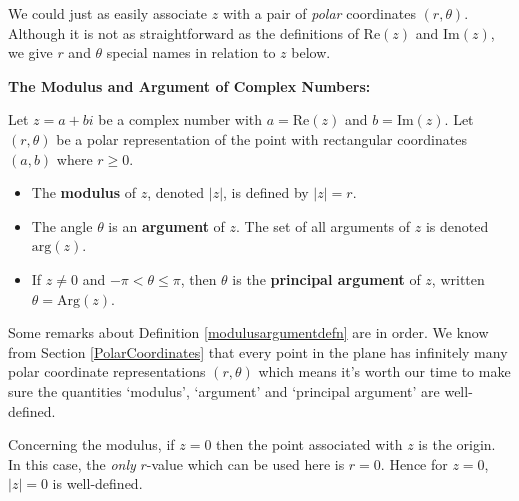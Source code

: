 \documentclass{ximera}
\begin{document}
We could just as easily associate $z$ with a pair of \textit{polar} coordinates $(r,\theta)$.  Although it is not as straightforward as the definitions of $\text{Re}(z)$ and $\text{Im}(z)$, we give $r$ and $\theta$ special names in relation to $z$ below.

 

\begin{definition} \label{modulusargumentdefn} \textbf{The Modulus and Argument of Complex Numbers:} 

 Let $z = a+bi$ be a complex number with $a = \text{Re}(z)$ and $b=\text{Im}(z)$.  Let $(r,\theta)$ be a polar representation of the point with rectangular coordinates $(a,b)$ where $r \geq 0$.

\begin{itemize}

\item  The \textbf{modulus} of $z$, denoted $|z|$, is defined by $|z| = r$.

\item  The angle $\theta$ is an \textbf{argument} of $z$. The set of all arguments of $z$ is denoted $\text{arg}(z)$.

\item  If $z \neq 0$ and $-\pi < \theta \leq \pi$, then $\theta$ is the \textbf{principal argument} of $z$, written $\theta = \text{Arg}(z)$. 

\end{itemize}

 

\end{definition}


 

Some remarks about  Definition \ref{modulusargumentdefn} are in order.  We know from Section \ref{PolarCoordinates} that every point in the plane has infinitely many polar coordinate representations $(r,\theta)$ which means it's worth our time to make sure the quantities `modulus', `argument' and `principal argument' are well-defined. 

 

Concerning the modulus, if $z = 0$ then the point associated with $z$ is the origin. In this case, the \textit{only} $r$-value which can be used here is $r=0$.  Hence for $z= 0$, $|z| = 0$ is well-defined.
\end{document}

